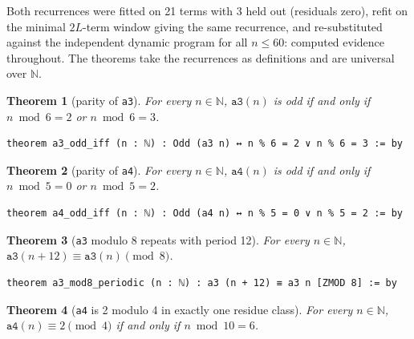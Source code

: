 \documentclass[11pt]{article}
\newtheorem{theorem}{Theorem}
\begin{document}
Both recurrences were fitted on 21 terms with 3 held out (residuals zero), refit
on the minimal $2L$-term window giving the same recurrence, and re-substituted
against the independent dynamic program for all $n \leq 60$: computed evidence
throughout. The theorems take the recurrences as definitions and are universal
over $\mathbb{N}$.

\begin{theorem}[parity of \texttt{a3}]\label{thm:t1}
For every $n \in \mathbb{N}$, $\texttt{a3}(n)$ is odd if and only if $n \bmod 6 =
2$ or $n \bmod 6 = 3$.
\end{theorem}

\begin{lstlisting}[caption={Formal statement of Theorem~\ref{thm:t1}: declaration
header (verbatim excerpt, line 34).},label={lst:t1}]
theorem a3_odd_iff (n : ℕ) : Odd (a3 n) ↔ n % 6 = 2 ∨ n % 6 = 3 := by
\end{lstlisting}

\begin{theorem}[parity of \texttt{a4}]\label{thm:t2}
For every $n \in \mathbb{N}$, $\texttt{a4}(n)$ is odd if and only if $n \bmod 5 =
0$ or $n \bmod 5 = 2$.
\end{theorem}

\begin{lstlisting}[caption={Formal statement of Theorem~\ref{thm:t2}: declaration
header (verbatim excerpt, line 166).},label={lst:t2}]
theorem a4_odd_iff (n : ℕ) : Odd (a4 n) ↔ n % 5 = 0 ∨ n % 5 = 2 := by
\end{lstlisting}

\begin{theorem}[\texttt{a3} modulo 8 repeats with period 12]\label{thm:t3}
For every $n \in \mathbb{N}$, $\texttt{a3}(n+12) \equiv \texttt{a3}(n) \pmod 8$.
\end{theorem}

\begin{lstlisting}[caption={Formal statement of Theorem~\ref{thm:t3}: declaration
header (verbatim excerpt, line 122).},label={lst:t3}]
theorem a3_mod8_periodic (n : ℕ) : a3 (n + 12) ≡ a3 n [ZMOD 8] := by
\end{lstlisting}

\begin{theorem}[\texttt{a4} is 2 modulo 4 in exactly one residue class]\label{thm:t4}
For every $n \in \mathbb{N}$, $\texttt{a4}(n) \equiv 2 \pmod 4$ if and only if
$n \bmod 10 = 6$.
\end{theorem}
\end{document}
